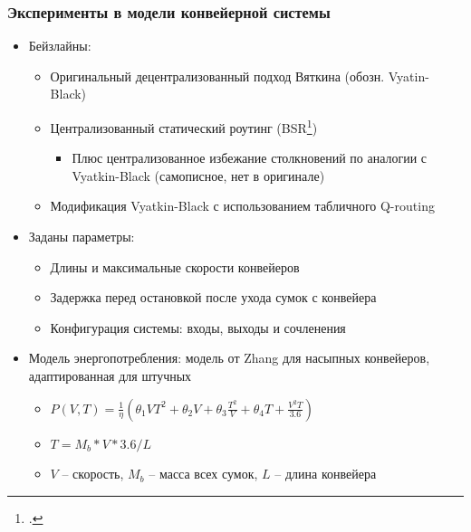 \documentclass{beamer}
\begin{document}

\begin{frame}
  \frametitle{Эксперименты в модели конвейерной системы}
  \begin{itemize}
  \item Бейзлайны:
    \begin{itemize}
    \item Оригинальный децентрализованный подход Вяткина (обозн. Vyatin-Black)
    \item Централизованный статический роутинг (BSR\footcite{johnstone2009status})
      \begin{itemize} 
      \item Плюс централизованное избежание столкновений по аналогии с Vyatkin-Black (самописное, нет в оригинале)
      \end{itemize}
    \item Модификация Vyatkin-Black с использованием табличного Q-routing
    \end{itemize}
  \item Заданы параметры:
    \begin{itemize}
    \item Длины и максимальные скорости конвейеров
    \item Задержка перед остановкой после ухода сумок с конвейера
    \item Конфигурация системы: входы, выходы и сочленения
    \end{itemize}
  \item Модель энергопотребления: модель от Zhang для насыпных конвейеров, адаптированная для штучных
    \begin{itemize}
    \item $P(V, T) = \frac{1}{\eta} \left( \theta_1 VT^2 + \theta_2 V + \theta_3 \frac{T^2}{V} + \theta_4 T + \frac{V^2T}{3.6} \right)$
    \item $T = M_b * V * 3.6 / L$ 
    \item $V$ -- скорость, $M_b$ -- масса всех сумок, $L$ -- длина конвейера
    \end{itemize} 
  \end{itemize}
\end{frame}

\end{document}

